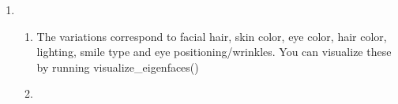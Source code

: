 \documentclass[11pt]{article}
\begin{document}
\begin{enumerate}
\item
\begin{enumerate}
\item
The variations correspond to facial hair, skin color, eye color, hair color, lighting, smile type and eye positioning/wrinkles. You can visualize these by running visualize_eigenfaces()
\item

\end{enumerate}
\end{enumerate}
\end{document}
